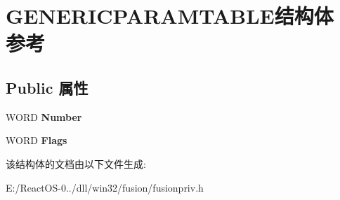 \hypertarget{struct_g_e_n_e_r_i_c_p_a_r_a_m_t_a_b_l_e}{}\section{G\+E\+N\+E\+R\+I\+C\+P\+A\+R\+A\+M\+T\+A\+B\+L\+E结构体 参考}
\label{struct_g_e_n_e_r_i_c_p_a_r_a_m_t_a_b_l_e}
\subsection*{Public 属性}
\begin{DoxyCompactItemize}
\item 
\mbox{\label{struct_g_e_n_e_r_i_c_p_a_r_a_m_t_a_b_l_e_aabae495e9cbe0121c995a589b9c2dc8f}} 
W\+O\+RD {\bfseries Number}
\item 
\mbox{\label{struct_g_e_n_e_r_i_c_p_a_r_a_m_t_a_b_l_e_acd30c16f798458116b2f66f32b7e704b}} 
W\+O\+RD {\bfseries Flags}
\end{DoxyCompactItemize}


该结构体的文档由以下文件生成\+:\begin{DoxyCompactItemize}
\item 
E\+:/\+React\+O\+S-\/0../dll/win32/fusion/fusionpriv.\+h\end{DoxyCompactItemize}
